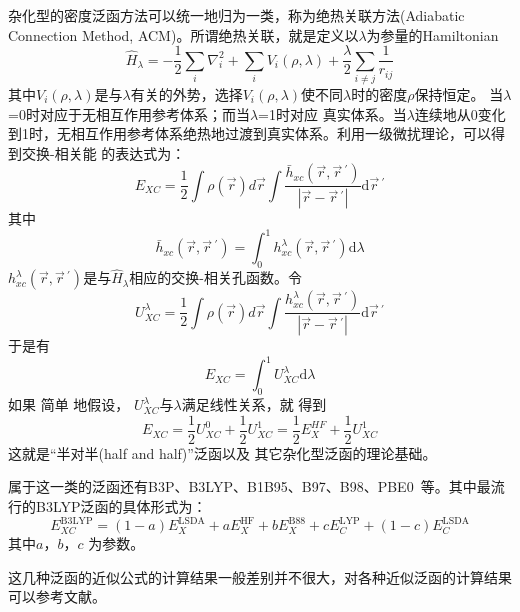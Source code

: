 杂化型的密度泛函方法可以统一地归为一类，称为绝热关联方法\textrm{(Adiabatic Connection Method, ACM)}。所谓绝热关联，就是定义以$\lambda$为参量的Hamiltonian
\begin{equation}
  \hat H_{\lambda}=-\dfrac12\sum_i\nabla_i^2+\sum_iV_i(\rho,\lambda)+\dfrac{\lambda}2\sum_{i\neq j}\dfrac1{r_{ij}}
  \label{eq:dft-27}
\end{equation}
其中$V_i(\rho,\lambda)$是与$\lambda$有关的外势，选择$V_i(\rho,\lambda)$使不同$\lambda$时的密度$\rho$保持恒定。%
当$\lambda$=0时对应于无相互作用参考体系；而当$\lambda$=1时对应%
真实体系。当$\lambda$连续地从0变化到1时，无相互作用参考体系绝热地过渡到真实体系。利用一级微扰理论\cite{JCP88-1053_1988}，可以得到交换-相关能%
{的}表达式为：
$$E_{XC}=\dfrac12\int\rho(\vec r)d\vec r\int\dfrac{\bar h_{xc}(\vec r,\vec r\,^{\prime})}{|\vec r-\vec r\,^{\prime}|}\textrm{d}\vec r\,^{\prime}$$
其中$$\bar h_{xc}(\vec r,\vec r\,^{\prime})=\int_0^1h_{xc}^{\lambda}(\vec r,\vec r\,^{\prime})\textrm{d}\lambda$$
$h_{xc}^{\lambda}(\vec r,\vec r\,^{\prime})$是与$\hat H_{\lambda}$相应的交换-相关孔函数。令
$$U_{XC}^{\lambda}=\dfrac12\int\rho(\vec r)d\vec r\int\dfrac{h_{xc}^{\lambda}(\vec r,\vec r\,^{\prime})}{|\vec r-\vec r\,^{\prime}|}\textrm{d}\vec r\,^{\prime}$$
于是有$$E_{XC}=\int_0^1U_{XC}^{\lambda}\textrm{d}\lambda$$
如果%
简单%
{地}假设，%
$U_{XC}^{\lambda}$与$\lambda$满足线性关系，就%
得到
$$E_{XC}=\dfrac12U_{XC}^0+\dfrac12U_{XC}^1=\dfrac12E_X^{HF}+\dfrac12U_{XC}^1$$
这就是“半对半(half and half)”泛函以及%
{其它}杂化型泛函的理论基础。

属于这一类的泛函还有B3P\cite{JCP98-5648_1993}、B3LYP\cite{JPC98-11623_1994}、B1B95\cite{JCP104-1040_1995}、B97\cite{JCP107-8554_1997}、B98\cite{JCP109-2092_1998}、PBE0\cite{JCP110-6158_1999}~等。其中最流行的B3LYP泛函的具体形式为：
$$E_{XC}^{\mathrm{B3LYP}}=(1-a)E_X^{\mathrm{LSDA}}+aE_X^{\mathrm{HF}}+bE_X^{\mathrm{B88}}+cE_C^{\mathrm{LYP}}+(1-c)E_C^{\mathrm{LSDA}}$$
其中$a$，$b$，$c$%
为参数。

这几种泛函的近似公式的计算结果{一般}差别并不很大，对各种近似泛函的计算结果可以参考文献。

